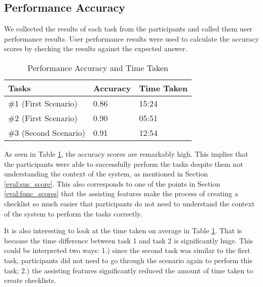 \subsection{Performance Accuracy}
\label{eval:acc}
We collected the results of each task from the participants and called them user performance results. User performance results were used to calculate the accuracy scores by checking the results against the expected answer.

\begin{table}[ht!]
    \centering
    \footnotesize
    \begin{tabular}{
      |p{}%
      |p{}%
      |p{}|%
      }
      \hline
      \centering Tasks & \centering Accuracy & \centering\arraybackslash  Time Taken   \\ \hline
      \hfil \#1 (First Scenario) & \hfil 0.86 & \hfil 15:24 \\ \hline
      \hfil \#2 (First Scenario) & \hfil 0.90 & \hfil 05:51 \\ \hline
      \hfil \#3 (Second Scenario) & \hfil 0.91 & \hfil 12:54 \\ \hline
    \end{tabular}
    \caption{Performance Accuracy and Time Taken}
    \label{tab:user_performance}
\end{table}

As seen in Table \ref{tab:user_performance}, the accuracy scores are remarkably high. This implies that the participants were able to successfully perform the tasks despite them not understanding the context of the system, as mentioned in Section \ref{eval:sus_score}. This also corresponds to one of the points in Section \ref{eval:func_scores} that the assisting features make the process of creating a checklist so much easier that participants do not need to understand the context of the system to perform the tasks correctly.

It is also interesting to look at the time taken on average in Table \ref{tab:user_performance}. That is because the time difference between task 1 and task 2 is significantly huge. This could be interpreted two ways: 1.) since the second task was similar to the first task, participants did not need to go through the scenario again to perform this task; 2.) the assisting features significantly reduced the amount of time taken to create checklists.

